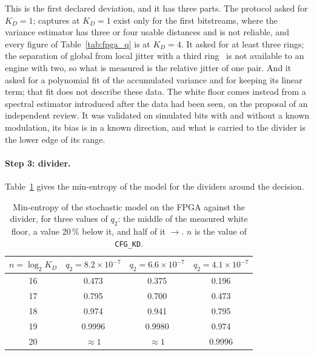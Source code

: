 This is the first declared deviation, and it has three parts. The
protocol asked for $K_D = 1$; captures at $K_D = 1$ exist only for the
first bitstreams, where the variance estimator has three or four usable
distances and is not reliable, and every figure of
Table~\ref{tab:fpga_q} is at $K_D = 4$. It asked for at least three
rings; the separation of
global from local jitter with a third ring~\cite{lubicz_2024_jitter} is
not available to an engine with two, so what is measured is the relative
jitter of one pair. And it asked for a
polynomial fit of the accumulated variance and for keeping its linear
term; that fit does not describe these data. The white floor comes
instead from a spectral estimator introduced after the data had been
seen, on the proposal of an independent review. It was validated on
simulated bits with and without a known modulation, its bias is in a
known direction, and what is carried to the divider is the lower edge of
its range.

\paragraph{Step 3: divider.} Table~\ref{tab:fpga_kd} gives the
min-entropy of the model for the dividers around the decision.

\begin{table}[htbp]
\centering
\caption{Min-entropy of the stochastic model on the \ac{FPGA} against
the divider, for three values of $q_2$: the middle of the measured white
floor, a value 20\,\% below it, and half of it \meas{}$\rightarrow$\est{}.
$n$ is the value of \texttt{CFG\_KD}.}
\label{tab:fpga_kd}
\small
\begin{tabular}{@{}cccc@{}}
\toprule
$n = \log_2 K_D$ & $q_2 = 8.2\times10^{-7}$ & $q_2 = 6.6\times10^{-7}$ & $q_2 = 4.1\times10^{-7}$ \\
\midrule
16 & 0.473  & 0.375  & 0.196 \\
17 & 0.795  & 0.700  & 0.473 \\
18 & 0.974  & 0.941  & 0.795 \\
19 & 0.9996 & 0.9980 & 0.974 \\
20 & $\approx 1$ & $\approx 1$ & 0.9996 \\
\bottomrule
\end{tabular}
\end{table}

